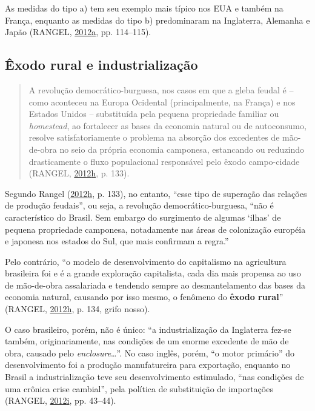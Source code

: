 \documentclass[a4paper, 12pt]{article}
\begin{document}
As medidas do tipo a) tem seu exemplo mais típico nos EUA e também na
França, enquanto as medidas do tipo b) predominaram na Inglaterra,
Alemanha e Japão (RANGEL,
\protect\hyperlink{ref-rangel1954}{2012}\protect\hyperlink{ref-rangel1954}{a},
pp. 114--115).

\hypertarget{exodo-rural-e-industrializacao}{%
\subsection{Êxodo rural e
industrialização}\label{exodo-rural-e-industrializacao}}

\begin{quote}
A revolução democrático-burguesa, nos casos em que a gleba feudal é --
como aconteceu na Europa Ocidental (principalmente, na França) e nos
Estados Unidos -- substituída pela pequena propriedade familiar ou
\emph{homestead}, ao fortalecer as bases da economia natural ou de
autoconsumo, resolve satisfatoriamente o problema na absorção dos
excedentes de mão-de-obra no seio da própria economia camponesa,
estancando ou reduzindo drasticamente o fluxo populacional responsável
pelo êxodo campo-cidade (RANGEL,
\protect\hyperlink{ref-rangel1986b}{2012}\protect\hyperlink{ref-rangel1986b}{h},
p. 133).
\end{quote}

Segundo Rangel
(\protect\hyperlink{ref-rangel1986b}{2012}\protect\hyperlink{ref-rangel1986b}{h},
p. 133), no entanto, ``esse tipo de superação das relações de produção
feudais'', ou seja, a revolução democrático-burguesa, ``não é
característico do Brasil. Sem embargo do surgimento de algumas `ilhas'
de pequena propriedade camponesa, notadamente nas áreas de colonização
européia e japonesa nos estados do Sul, que mais confirmam a regra.''

Pelo contrário, ``o modelo de desenvolvimento do capitalismo na
agricultura brasileira foi e é a grande exploração capitalista, cada dia
mais propensa ao uso de mão-de-obra assalariada e tendendo sempre ao
desmantelamento das bases da economia natural, causando por isso mesmo,
o fenômeno do \textbf{êxodo rural}'' (RANGEL,
\protect\hyperlink{ref-rangel1986b}{2012}\protect\hyperlink{ref-rangel1986b}{h},
p. 134, grifo nosso).

O caso brasileiro, porém, não é único: ``a industrialização da
Inglaterra fez-se também, originariamente, nas condições de um enorme
excedente de mão de obra, causado pelo \emph{enclosure}\ldots{}''. No
caso inglês, porém, ``o motor primário'' do desenvolvimento foi a
produção manufatureira para exportação, enquanto no Brasil a
industrialização teve seu desenvolvimento estimulado, ``nas condições de
uma crônica crise cambial'', pela política de substituição de
importações (RANGEL,
\protect\hyperlink{ref-rangel1962}{2012}\protect\hyperlink{ref-rangel1962}{i},
pp. 43--44).
\end{document}
